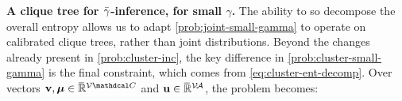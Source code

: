 \textbf{A clique tree for ${\bar\gamma}$-inference, for small $\gamma$.}
The ability to so decompose the overall entropy allows us to adapt 
\eqref{prob:joint-small-gamma} 
to operate on calibrated clique trees, rather than joint distributions. 
Beyond the changes already present in \eqref{prob:cluster-inc},
the key difference in \eqref{prob:cluster-small-gamma} 
is the final constraint, which comes from
\eqref{eq:cluster-ent-decomp}.
Over vectors
$\mat v, \bmu \in \Rext^{\V\C}$ and
$\mathbf{u} \in \mskip1mu\overline{\mskip-1mu\mathbb R\!}\,^{\mathcal V\!\mathcal A}$,
the problem becomes: 

